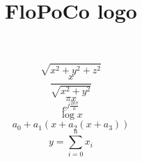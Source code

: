 \documentclass[times, 10pt,twocolumn]{article}
\title{FloPoCo logo}
\begin{document}
 


  \begin{center}
    \scalebox{0.8}{\mbox{}}%
 \end{center}
\color[rgb]{0,0.5,0.5}$${\sqrt{x^2+y^2+z^2}}$$
\color[rgb]{1,0,0}$$\frac{x}{\sqrt{x^2+y^2}}$$
\color[rgb]{0,0,1}$$\pi{x}$$
\color[rgb]{1,0,1}$$e^{j\frac{2k\pi}{n}}$$
\color[rgb]{.56,0,0}$$\log{x}$$
\color[rgb]{1,0,0}$$a_0+a_1(x+a_2(x+a_3))$$
\color[rgb]{0,.69,0}$$\displaystyle y=\sum_{i=0}^n x_i$$
\end{document}
